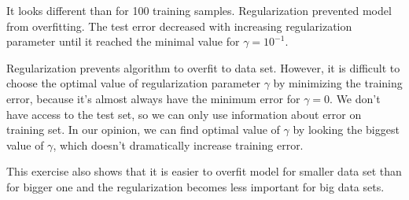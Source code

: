 \documentclass{article} %
\begin{document}
It looks different than for 100 training samples. Regularization prevented model from overfitting. The test error decreased with increasing regularization parameter until it reached the minimal value for $\gamma = 10^{-1}$. 

Regularization prevents algorithm to overfit to data set. However, it is difficult to choose the optimal value of regularization parameter $\gamma$ by minimizing the training error, because it's almost always have the minimum error for $\gamma = 0$. We don't have access to the test set, so we can only use information about error on training set. In our opinion, we can find optimal value of $\gamma$ by looking the biggest value of $\gamma$, which doesn't dramatically increase training error.

This exercise also shows that it is easier to overfit model for smaller data set than for bigger one and the regularization becomes less important for big data sets.
\end{document}
